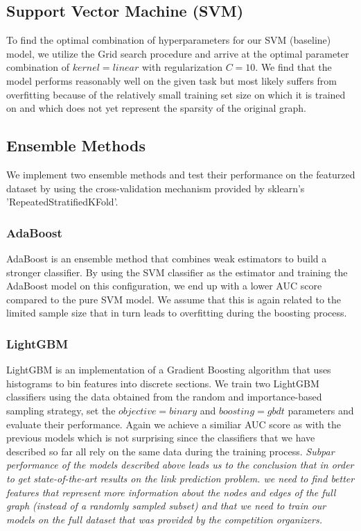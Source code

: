 \documentclass[11pt, oneside]{article}
\begin{document}
\subsection{Support Vector Machine (SVM)}
\label{sec:svm}
\vspace{-5pt}
To find the optimal combination of hyperparameters for our SVM (baseline) model, we utilize the Grid search procedure and arrive at the optimal parameter combination of $kernel=linear$ with regularization $C=10$. We find that the model performs reasonably well on the given task but most likely suffers from overfitting because of the relatively small training set size on which it is trained on and which does not yet represent the sparsity of the original graph.
\vspace{-10pt}
\subsection{Ensemble Methods}
\label{sec:ensemble}
\vspace{-5pt}
We  implement two ensemble methods and test their performance on the featurzed dataset by using the cross-validation mechanism provided by sklearn's 'RepeatedStratifiedKFold'.
\vspace{-10pt}
\subsubsection{AdaBoost}
\vspace{-5pt}
AdaBoost is an ensemble method that combines weak estimators to build a stronger classifier. By using the SVM classifier as the estimator and training the AdaBoost model on this configuration, we end up with a lower AUC score compared to the pure SVM model. We assume that this is again related to the limited sample size that in turn leads to overfitting during the boosting process.
\vspace{-10pt}
\subsubsection{LightGBM}
\vspace{-5pt}
LightGBM \cite{lightgbm} is an implementation of a Gradient Boosting algorithm that uses histograms to bin features into discrete sections. We train two LightGBM classifiers using the data obtained from the random and importance-based sampling strategy, set the $objective=binary$ and $boosting=gbdt$ parameters and evaluate their performance. Again we achieve a similiar AUC score as with the previous models which is not surprising since the classifiers that we have described so far all rely on the same data during the training process.
\vspace{5pt}
\newline
\textit{Subpar performance of the models described above leads us to the conclusion that in order to get state-of-the-art results on the link prediction problem. we need to find better features that represent more information about the nodes and edges of the full graph (instead of a randomly sampled subset) and that we need to train our models on the full dataset that was provided by the competition organizers.}
\vspace{-10pt}
\end{document}
